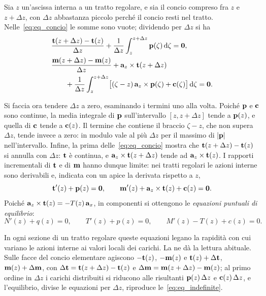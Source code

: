 Sia $z$ un'ascissa interna a un tratto regolare, e sia
il concio compreso fra $z$ e $z + \Delta z$, con
$\Delta z$ abbastanza piccolo perché il concio resti nel
tratto. Nelle~\eqref{eq:eq_concio} le somme sono vuote;
dividendo per $\Delta z$ si ha
\begin{equation}\label{eq:rapporti_incrementali}
	\begin{aligned}
		&\frac{\mathbf{t}(z+\Delta z) - \mathbf{t}(z)}{\Delta z}
		+ \frac{1}{\Delta z}\int_z^{z+\Delta z} \mathbf{p}(\zeta)\,\mathrm{d}\zeta = \mathbf{0},\\
		&\frac{\mathbf{m}(z+\Delta z) - \mathbf{m}(z)}{\Delta z}
		+ \mathbf{a}_z \times \mathbf{t}(z+\Delta z)\\
		&\qquad + \frac{1}{\Delta z}\int_z^{z+\Delta z}
		\bigl[(\zeta - z)\,\mathbf{a}_z \times \mathbf{p}(\zeta) + \mathbf{c}(\zeta)\bigr]\,\mathrm{d}\zeta = \mathbf{0}.
	\end{aligned}
\end{equation}

Si faccia ora tendere $\Delta z$ a zero, esaminando i
termini uno alla volta. Poiché $\mathbf{p}$ e $\mathbf{c}$ sono
continue, la media integrale di $\mathbf{p}$ sull'intervallo
$[z, z + \Delta z]$ tende a $\mathbf{p}(z)$, e quella di $\mathbf{c}$
tende a $\mathbf{c}(z)$. Il termine che contiene il braccio
$\zeta - z$, che non supera $\Delta z$, tende invece a
zero: in modulo vale al più $\Delta z$ per il massimo
di $|\mathbf{p}|$ nell'intervallo. Infine,
la prima delle~\eqref{eq:eq_concio} mostra che
$\mathbf{t}(z + \Delta z) - \mathbf{t}(z)$ si annulla con $\Delta z$:
$\mathbf{t}$ è continua, e $\mathbf{a}_z \times \mathbf{t}(z + \Delta z)$
tende ad $\mathbf{a}_z \times \mathbf{t}(z)$. I rapporti incrementali
di $\mathbf{t}$ e di $\mathbf{m}$ hanno dunque limite: nei tratti
regolari le azioni interne sono derivabili e, indicata
con un apice la derivata rispetto a $z$,
\begin{equation*}
	\mathbf{t}'(z) + \mathbf{p}(z) = \mathbf{0}, \qquad
	\mathbf{m}'(z) + \mathbf{a}_z \times \mathbf{t}(z) + \mathbf{c}(z) = \mathbf{0}.
\end{equation*}
Poiché $\mathbf{a}_z \times \mathbf{t}(z) = -T(z)\,\mathbf{a}_x$, in componenti si
ottengono le \emph{equazioni puntuali di
	equilibrio}:
\begin{equation}\label{eq:eq_indefinite}
	N'(z) + q(z) = 0,
	\qquad
	T'(z) + p(z) = 0,
	\qquad
	M'(z) - T(z) + c(z) = 0.
\end{equation}

In ogni sezione di un tratto regolare queste equazioni
legano la rapidità con cui variano le azioni
interne ai valori locali dei carichi. La
 ne dà la lettura
abituale. Sulle facce del concio elementare agiscono
$-\mathbf{t}(z)$, $-\mathbf{m}(z)$ e $\mathbf{t}(z) + \Delta\mathbf{t}$,
$\mathbf{m}(z) + \Delta\mathbf{m}$, con
$\Delta\mathbf{t} = \mathbf{t}(z + \Delta z) - \mathbf{t}(z)$ e
$\Delta\mathbf{m} = \mathbf{m}(z + \Delta z) - \mathbf{m}(z)$; al primo ordine
in $\Delta z$ i carichi distribuiti si riducono alle
risultanti $\mathbf{p}(z)\,\Delta z$ e $\mathbf{c}(z)\,\Delta z$,
e l'equilibrio, divise le equazioni per $\Delta z$,
riproduce le~\eqref{eq:eq_indefinite}.

